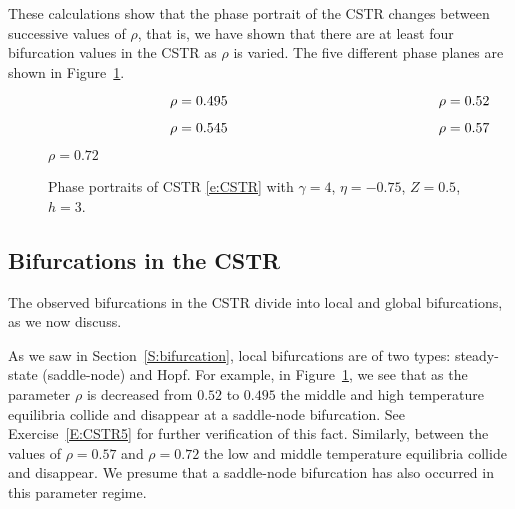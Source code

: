 \documentclass{ximera}
\begin{document}
These calculations show that the phase portrait of the CSTR changes 
between successive values of $\rho$, that is, we have shown that 
there are at least four bifurcation values in the CSTR as $\rho$ 
is varied.  The five different phase planes are shown in Figure~\ref{F:CSTR}.


\begin{figure}
           \centerline{%
	   }	
		\vspace*{-0.2in}	
		$\hspace{1.2in} \mbox{$\rho=0.495$ \hspace{2.0in} $\rho=0.52$}$
           \centerline{%
	   }
		\vspace*{-0.4in}
		
		$\hspace{1.2in} \mbox{$\rho=0.545$ \hspace{2.0in} $\rho=0.57$}$
		\vspace{0.4in}
	   \centerline{%
           }
 		\vspace*{-0.8in}
		
		\hspace{2.6in} $\rho=0.72$
          \caption{Phase portraits of CSTR \protect\eqref{e:CSTR} 
	with $\gamma=4$, $\eta=-0.75$, $Z=0.5$, $h =3$.}
           \label{F:CSTR}
\end{figure}


\subsection*{Bifurcations in the CSTR}


The observed bifurcations in the CSTR divide into local and global 
bifurcations, as we now discuss.

As we saw in Section~\ref{S:bifurcation}, local bifurcations are of two 
types: steady-state (saddle-node) and Hopf.  
  For example, in Figure~\ref{F:CSTR}, we see that as 
the parameter $\rho$ is decreased from $0.52$ to $0.495$ the middle and high 
temperature equilibria collide and disappear at a saddle-node bifurcation.  
See Exercise~\ref{E:CSTR5} for further verification of this fact.  Similarly,
between the values of $\rho=0.57$ and $\rho=0.72$ the low and middle 
temperature equilibria collide and disappear.  We presume that a  
saddle-node bifurcation has also occurred in this parameter regime.
\end{document}
